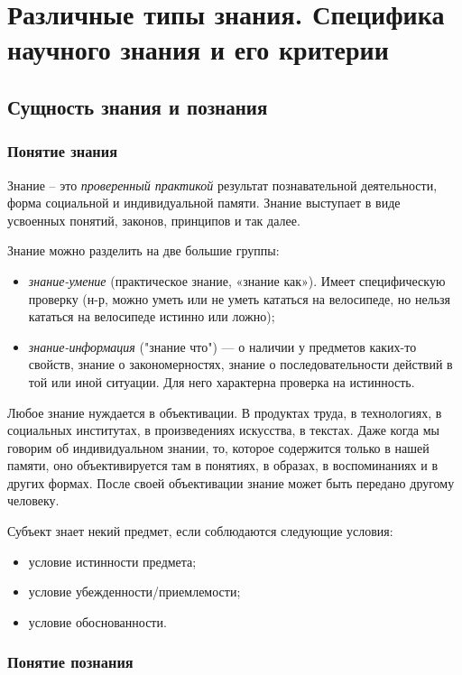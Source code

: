 \section{Различные типы знания. Специфика научного знания и его критерии}  

\subsection{Сущность знания и познания}

\subsubsection{Понятие знания}
 
Знание – это \textit{проверенный практикой} результат познавательной деятельности, 
форма социальной и индивидуальной памяти. Знание выступает в виде усвоенных понятий, законов,
принципов и так далее.  

Знание можно разделить на две большие группы: 
\begin{itemize}
    \item \textit{знание-умение} (практическое знание, «знание как»). Имеет специфическую проверку (н-р, можно уметь или не уметь кататься на велосипеде, но нельзя
кататься на велосипеде истинно или ложно);
    \item \textit{знание-информация} ("знание что") --- о наличии у предметов каких-то свойств, знание о закономерностях, знание о последовательности действий в той или иной ситуации. Для него характерна проверка на истинность.  
\end{itemize}


Любое знание нуждается в
объективации. В продуктах труда, в технологиях, в социальных институтах, в
произведениях искусства, в текстах. Даже когда мы говорим об индивидуальном
знании, то, которое содержится только в нашей памяти, оно объективируется там в
понятиях, в образах, в воспоминаниях и в других формах.  После своей
объективации знание может быть передано другому человеку.  

Субъект знает некий предмет, если соблюдаются следующие условия:
\begin{itemize}
    \item условие истинности предмета;
    \item условие убежденности/приемлемости;
    \item условие обоснованности.
\end{itemize}


\subsubsection{Понятие познания}

